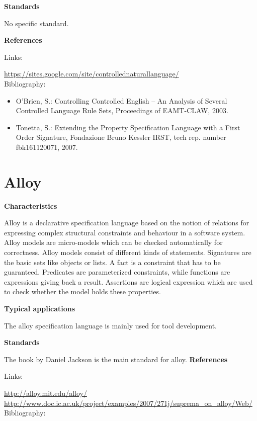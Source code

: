 \documentclass{./template/openetcs_report}
\begin{document}
	\textbf{Standards}

No specific standard.

	\textbf{References}

Links:

\url{https://sites.google.com/site/controllednaturallanguage/} \\[4pt]

Bibliography:

\begin{itemize}
\item O'Brien, S.: Controlling Controlled English -- An Analysis of Several Controlled Language Rule Sets, Proceedings of EAMT-CLAW, 2003.
\item Tonetta, S.: Extending the Property Specification Language with a First Order Signature, Fondazione Bruno Kessler IRST, tech rep. number fbk161120071, 2007.
\end{itemize}

\section{Alloy}


	\textbf{Characteristics}

Alloy is a declarative specification language based on the notion of relations for expressing complex structural constraints and behaviour in a software system. Alloy models are micro-models which can be checked automatically for correctness. 
Alloy models consist of different kinds of statements. Signatures are the basic sets like objects or lists. A fact is a constraint that has to be guaranteed. Predicates are parameterized constraints, while functions are expressions giving back a result. Assertions are logical expression which are used to check whether the model holds these properties.

	\textbf{Typical applications}

The alloy specification language is mainly used for tool development.

	\textbf{Standards}

The book by Daniel Jackson is the main standard for alloy.
	\textbf{References}

Links:

\url{http://alloy.mit.edu/alloy/} \\[4pt]
\url{http://www.doc.ic.ac.uk/project/examples/2007/271j/suprema_on_alloy/Web/} \\[4pt]

Bibliography:
\end{document}
